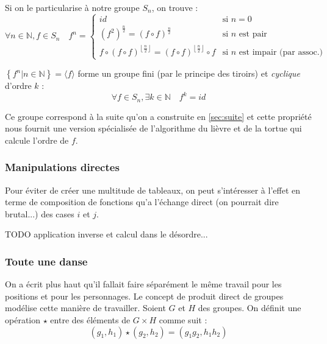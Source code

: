 \documentclass[11pt,a4paper,oneside]{book}
\begin{document}
Si on le particularise à notre groupe $S_n$, on trouve : \[
	\forall n \in \mathbb{N}, f \in S_n \quad
	f^n = \left\{\begin{array}{ll}
		id &
			\text{si $n=0$} \\
		\left(f^2\right)^{\frac n2} = \left(f\circ f\right)^{\frac n2} &
			\text{si $n$ est pair} \\
		f\circ \left(f\circ f\right)^{\left\lfloor\frac n2\right\rfloor} =
		\left(f\circ f\right)^{\left\lfloor\frac n2\right\rfloor}\circ f &
			\text{si $n$ est impair (par assoc.)}
	\end{array}\right.
\]

$\left\{f^n|n \in \mathbb{N}\right\}=\langle f\rangle$ forme un groupe fini
(par le principe des tiroirs) et \emph{cyclique} d'ordre $k$ : \[
	\forall f\in S_n, \exists k\in \mathbb{N} \quad f^k=id
\]

Ce groupe correspond à la suite qu'on a construite en \ref{sec:suite} et cette
propriété nous fournit une version spécialisée de l'algorithme du lièvre et de
la tortue qui calcule l'ordre de $f$.

\subsubsection{Manipulations directes}
Pour éviter de créer une multitude de tableaux, on peut s'intéresser à l'effet
en terme de composition de fonctions qu'a l'échange direct (on pourrait dire
brutal...) des cases $i$ et $j$.

TODO application inverse et calcul dans le désordre...

\subsubsection{Toute une danse}
On a écrit plus haut qu'il fallait faire séparément le même travail pour les
positions et pour les personnages. Le concept de produit direct de groupes
modélise cette manière de travailler. Soient $G$ et $H$ des groupes. On définit
une opération $\star$ entre des éléments de $G\times H$ comme suit : \[
	(g_1, h_1) \star (g_2, h_2) = (g_1g_2, h_1h_2)
\]
\end{document}
